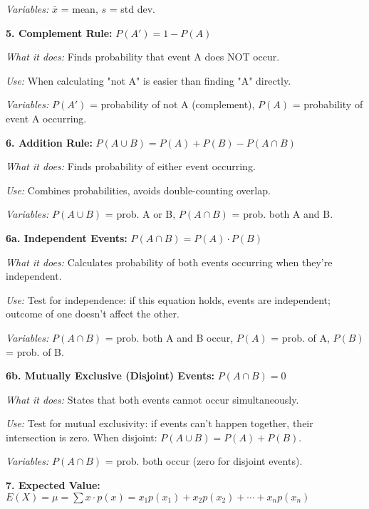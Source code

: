 \documentclass[10pt]{extarticle}
\begin{document}
\begin{multicol}{2}
\textit{Variables:} $\bar{x}$ = mean, $s$ = std dev.

\vspace{3pt}

\textbf{5. Complement Rule:} $P(A') = 1 - P(A)$

\textit{What it does:} Finds probability that event A does NOT occur. 

\textit{Use:} When calculating "not A" is easier than finding "A" directly. 

\textit{Variables:} $P(A')$ = probability of not A (complement), $P(A)$ = probability of event A occurring.

\vspace{3pt}

\textbf{6. Addition Rule:} $P(A \cup B) = P(A) + P(B) - P(A \cap B)$

\textit{What it does:} Finds probability of either event occurring. 

\textit{Use:} Combines probabilities, avoids double-counting overlap. 

\textit{Variables:} $P(A \cup B)$ = prob. A or B, $P(A \cap B)$ = prob. both A and B.

\vspace{3pt}

\textbf{6a. Independent Events:} $P(A \cap B) = P(A) \cdot P(B)$

\textit{What it does:} Calculates probability of both events occurring when they're independent. 

\textit{Use:} Test for independence: if this equation holds, events are independent; outcome of one doesn't affect the other. 

\textit{Variables:} $P(A \cap B)$ = prob. both A and B occur, $P(A)$ = prob. of A, $P(B)$ = prob. of B.

\vspace{3pt}

\textbf{6b. Mutually Exclusive (Disjoint) Events:} $P(A \cap B) = 0$

\textit{What it does:} States that both events cannot occur simultaneously. 

\textit{Use:} Test for mutual exclusivity: if events can't happen together, their intersection is zero. When disjoint: $P(A \cup B) = P(A) + P(B)$. 

\textit{Variables:} $P(A \cap B)$ = prob. both occur (zero for disjoint events).

\vspace{3pt}

\textbf{7. Expected Value:} $E(X) = \mu = \sum x \cdot p(x) = x_1p(x_1) + x_2p(x_2) + \cdots + x_np(x_n)$


\end{multicol}
\end{document}
